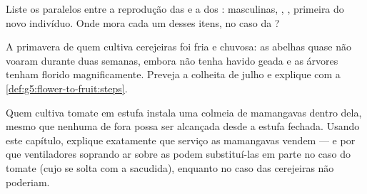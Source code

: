 \begin{exercise}[$\star\star$]\label{exo:g5:flower-to-fruit:9}
Liste os paralelos entre a reprodução das  e a dos :
 masculinas, , ,
primeira  do novo indivíduo. Onde mora cada um desses itens, no
caso da ?
\end{exercise}

\begin{exercise}[$\star\star$]\label{exo:g5:flower-to-fruit:10}
A primavera de quem cultiva cerejeiras foi fria e chuvosa: as
abelhas quase não voaram durante duas semanas, embora não tenha
havido geada e as árvores tenham florido magnificamente. Preveja a
colheita de julho e explique com a \cref{def:g5:flower-to-fruit:steps}.
\end{exercise}

\begin{exercise}[$\star\star\star$]\label{exo:g5:flower-to-fruit:11}
Quem cultiva tomate em estufa instala uma colmeia de mamangavas
dentro dela, mesmo que nenhuma  de fora possa ser alcançada
desde a estufa fechada. Usando este capítulo, explique exatamente
que serviço as mamangavas vendem --- e por que ventiladores soprando
ar sobre as  podem substituí-las em parte no caso do tomate
(cujo  se solta com a sacudida), enquanto no caso das cerejeiras
não poderiam.
\end{exercise}
